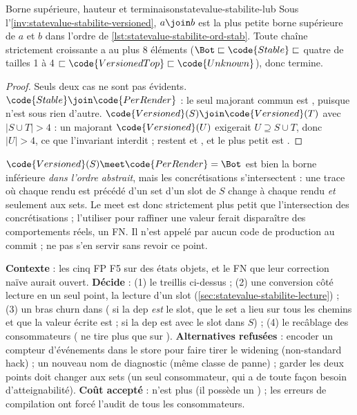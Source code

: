 \begin{proposition}{Borne supérieure, hauteur et terminaison}{statevalue-stabilite-lub}
  Sous l'\cref{inv:statevalue-stabilite-versioned}, $a \join b$ est la plus
  petite borne supérieure de $a$ et $b$ dans l'ordre de
  \cref{lst:statevalue-stabilite-ord-stab}. Toute chaîne strictement
  croissante a au plus 8 éléments ($\Bot \sqsubset \code{Stable} \sqsubset$
  quatre  de tailles 1 à 4 $\sqsubset \code{VersionedTop}
  \sqsubset \code{Unknown}$), donc  termine.
\end{proposition}
\begin{proof}
  Seuls deux cas ne sont pas évidents. $\code{Stable} \join
  \code{PerRender}$ : le seul majorant commun est , puisque
   n'est sous rien d'autre. $\code{Versioned}(S) \join
  \code{Versioned}(T)$ avec $|S \cup T| > 4$ : un majorant
  $\code{Versioned}(U)$ exigerait $U \supseteq S \cup T$, donc $|U| > 4$, ce
  que l'invariant interdit ; restent  et ,
  et le plus petit est .
\end{proof}

\begin{piege}
  $\code{Versioned}(S) \meet \code{PerRender} = \Bot$ est bien la borne
  inférieure \emph{dans l'ordre abstrait}, mais les concrétisations
  s'intersectent : une trace où chaque rendu est précédé d'un set d'un slot
  de $S$ change à chaque rendu \emph{et} seulement aux sets. Le meet est
  donc strictement plus petit que l'intersection des concrétisations ;
  l'utiliser pour raffiner une valeur ferait disparaître des comportements
  réels, un FN. Il n'est appelé par aucun code de production au commit
  \snapshotCommit{} ; ne pas s'en servir sans revoir ce point.
\end{piege}

\begin{decision}
\textbf{Contexte} : les cinq FP F5 sur des états objets, et le FN
 que leur correction naïve aurait ouvert.
\textbf{Décide} : (1) le treillis ci-dessus ; (2) une conversion \og côté
lecture\fg{} en un seul point, la lecture d'un slot
(\cref{sec:statevalue-stabilite-lecture}) ; (3) un bras churn dans
 (\Error{} si la dep \emph{est} le slot, que le set a
lieu sur tous les chemins et que la valeur écrite est  ;
\Warning{} si la dep est  avec le slot dans $S$) ; (4) le
recâblage des consommateurs ( ne tire plus que
sur ). \textbf{Alternatives refusées} : encoder un compteur
d'événements dans le store pour faire tirer le widening (\og non-standard
hack\fg{}) ; un nouveau nom de diagnostic (même classe de panne) ; garder les
deux points \og doit changer aux sets\fg{} (un seul consommateur, qui a de
toute façon besoin d'atteignabilité). \textbf{Coût accepté} :
 n'est plus  (il possède un ) ; les
erreurs de compilation ont forcé l'audit de tous les consommateurs.
\end{decision}


